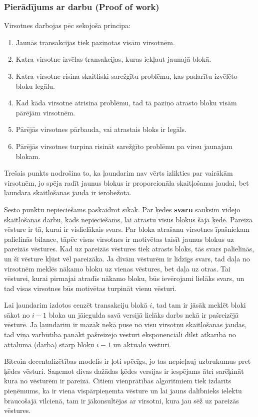 \subsubsection{Pierādījums ar darbu (Proof of work)}
Virsotnes darbojas pēc sekojoša principa:\cite{nakamoto08}
\begin{enumerate}
    \item Jaunās transakcijas tiek paziņotas visām virsotnēm.
    \item Katra virsotne izvēlas transakcijas, kuras iekļaut jaunajā blokā.
    \item Katra virsotne risina skaitliski sarežģītu problēmu, kas padarītu izvēlēto bloku legālu.
    \item Kad kāda virsotne atrisina problēmu, tad tā paziņo atrasto bloku visām pārējām virsotnēm.
    \item Pārējās virsotnes pārbauda, vai atrastais bloks ir legāls.
    \item Pārējās virsotnes turpina risināt sarežģīto problēmu pa virsu jaunajam blokam.
\end{enumerate}
Trešais punkts nodrošina to, ka ļaundarim nav vērts izlikties par vairākām virsotnēm, jo spēja radīt jaunus blokus ir proporcionāla skaitļošanas jaudai, bet ļaundara skaitļošanas jauda ir ierobežota.

Sesto punktu nepieciešams paskaidrot sīkāk. Par ķēdes \textbf{svaru} sauksim vidējo skaitļošanas darbu, kāds nepieciešams, lai atrastu visus blokus šajā ķēdē. Pareizā vēsture ir tā, kurai ir vislielākais svars. Par bloka atrašanu virsotnes īpašniekam palielinās bilance, tāpēc visas virsotnes ir motivētas taisīt jaunus blokus uz pareizās vēstures. Kad uz pareizās vēstures tiek atrasts bloks, tās svars palielinās, un šī vēsture kļūst vēl pareizāka. Ja divām vēsturēm ir līdzīgs svars, tad daļa no virsotnēm meklēs nākamo bloku uz vienas vēstures, bet daļa uz otras. Tai vēsturei, kurai pirmajai atradīs nākamo bloku, būs ievērojami lielāks svars, un tad visas virsotnes būs motivētas turpināt vienu vēsturi.

Lai ļaundarim izdotos cenzēt transakciju blokā $i$, tad tam ir jāsāk meklēt bloki sākot no $i-1$ bloka un jāiegulda savā versijā lielāks darbs nekā ir pašreizējā vēsturē. Ja ļaundarim ir mazāk nekā puse no visu virsotņu skaitļošanas jaudas, tad viņa varbūtība panākt pašreizējo vēsturi eksponenciāli dilst atkarībā no attāluma (darba) starp bloku $i-1$ un aktuālo vēsturi.\cite{nakamoto08}

Bitcoin decentalizētības modelis ir ļoti spēcīgs, jo tas nepieļauj uzbrukumus pret ķēdes vēsturi. Saņemot divas dažādas ķēdes versijas ir iespējams ātri sarēķināt kura no vēsturēm ir pareizā. Citiem vienprātības algoritmiem tiek izdarīts pieņēmums, ka ir viena vispārpieņemta vēsture un lai jauns dalībnieks ielektu braucošajā vilcienā, tam ir jākonsultējas ar virsotni, kura jau sēž uz pareizās vēstures.

